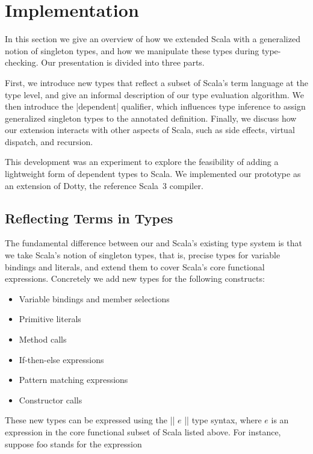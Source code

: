 \section{Implementation}
\label{sec:extending-scala}

In this section we give an overview of how we extended Scala with a generalized notion of singleton types, and how we manipulate these types during type-checking.
Our presentation is divided into three parts.

First, we introduce new types that reflect a subset of Scala's term language at the type level, and give an informal description of our type evaluation algorithm.
We then introduce the |dependent| qualifier, which influences type inference to assign generalized singleton types to the annotated definition.
Finally, we discuss how our extension interacts with other aspects of Scala, such as side effects, virtual dispatch, and recursion.

This development was an experiment to explore the feasibility of adding a lightweight form of dependent types to Scala.
We implemented our prototype as an extension of Dotty, the reference Scala~3 compiler.

\subsection{Reflecting Terms in Types}

The fundamental difference between our and Scala's existing type system is that we take Scala's notion of singleton types, that is, precise types for variable bindings and literals, and extend them to cover Scala's core functional expressions.
Concretely we add new types for the following constructs:

\begin{itemize}
  \item Variable bindings and member selections
  \item Primitive literals
  \item Method calls
  \item If-then-else expressions
  \item Pattern matching expressions
  \item Constructor calls
\end{itemize}

These new types can be expressed using the |{| $e$ |}| type syntax, where $e$ is an expression in the core functional subset of Scala listed above.
For instance, suppose $\text{foo}$ stands for the expression


